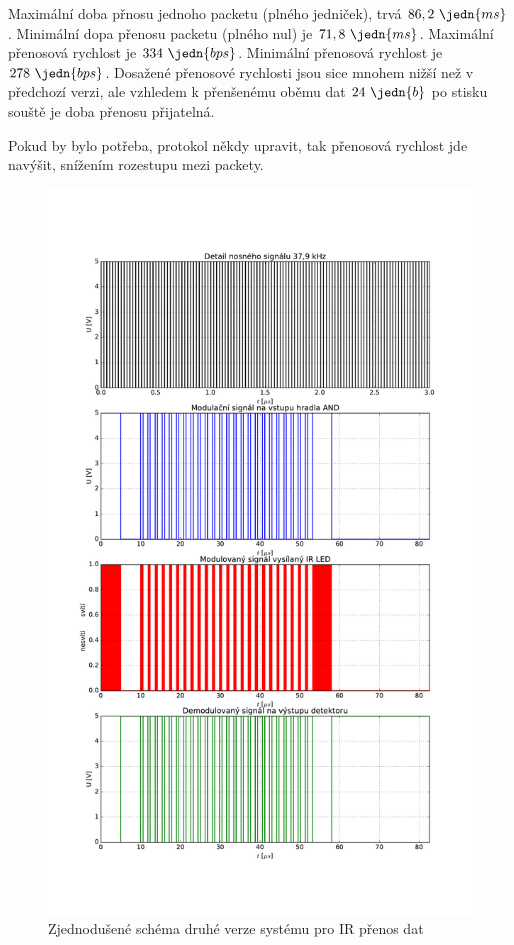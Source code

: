 Maximální doba přnosu jednoho packetu (plného jedniček), trvá $86,2~\jedn{ms}$. Minimální dopa přenosu packetu (plného nul) je $71,8~\jedn{ms}$. Maximální přenosová rychlost je $334~\jedn{bps}$. Minimální přenosová rychlost je $278~\jedn{bps}$. Dosažené přenosové rychlosti jsou sice mnohem nižší než v předchozí verzi, ale vzhledem k přenšenému oběmu dat $24~\jedn{b}$ po stisku souště je doba přenosu přijatelná.

Pokud by bylo potřeba, protokol někdy upravit, tak přenosová rychlost jde navýšit, snížením rozestupu mezi packety.


\begin{figure}[H]
    \begin{center}
        \includegraphics[width=\textwidth]{img/model-ir-komunikace}
    \end{center}
    \caption{Zjednodušené schéma druhé verze systému pro IR přenos dat}
\end{figure}
